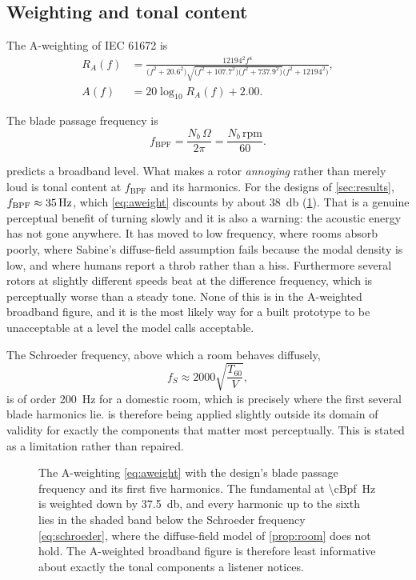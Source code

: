 \subsection{Weighting and tonal content}

The A-weighting of IEC 61672 is
\begin{align}
  R_A(f) &= \frac{12194^2 f^4}
    {\big(f^2+20.6^2\big)\sqrt{\big(f^2+107.7^2\big)\big(f^2+737.9^2\big)}
     \big(f^2+12194^2\big)}, \nonumber\\
  A(f) &= 20\log_{10}R_A(f) + 2.00 .
  \label{eq:aweight}
\end{align}

The blade passage frequency is
\begin{equation}
  f_{\mathrm{BPF}} = \frac{N_b\,\Omega}{2\pi} = \frac{N_b\,\mathrm{rpm}}{60} .
  \label{eq:bpf}
\end{equation}

\begin{remark}
 predicts a broadband level. What makes a rotor
\emph{annoying} rather than merely loud is tonal content at
$f_{\mathrm{BPF}}$ and its harmonics. For the designs of \cref{sec:results},
$f_{\mathrm{BPF}}\approx\SI{35}{\hertz}$, which \cref{eq:aweight} discounts by
about \SI{38}{\decibel} (\cref{fig:aweight}). That is a genuine perceptual benefit of turning slowly
and it is also a warning: the acoustic energy has not gone anywhere. It has
moved to low frequency, where rooms absorb poorly, where Sabine's diffuse-field
assumption fails because the modal density is low, and where humans report a
throb rather than a hiss. Furthermore several rotors at slightly different
speeds beat at the difference frequency, which is perceptually worse than a
steady tone. None of this is in the A-weighted broadband figure, and it is the
most likely way for a built prototype to be unacceptable at a level the model
calls acceptable.
\end{remark}

The Schroeder frequency, above which a room behaves diffusely,
\begin{equation}
  f_S \approx 2000\sqrt{\frac{T_{60}}{V}} ,
  \label{eq:schroeder}
\end{equation}
is of order \SI{200}{\hertz} for a domestic room, which is precisely where the
first several blade harmonics lie.  is therefore being applied
slightly outside its domain of validity for exactly the components that matter
most perceptually. This is stated as a limitation rather than repaired.

\begin{figure}[tbp]
\centering

\caption{The A-weighting \cref{eq:aweight} with the design's blade passage
frequency and its first five harmonics. The fundamental at
\SI{\cBpf}{\hertz} is weighted down by \SI{37.5}{\decibel}, and every harmonic
up to the sixth lies in the shaded band below the Schroeder frequency
\cref{eq:schroeder}, where the diffuse-field model of \cref{prop:room} does not
hold. The A-weighted broadband figure is therefore least informative about
exactly the tonal components a listener notices.}
\label{fig:aweight}
\end{figure}

